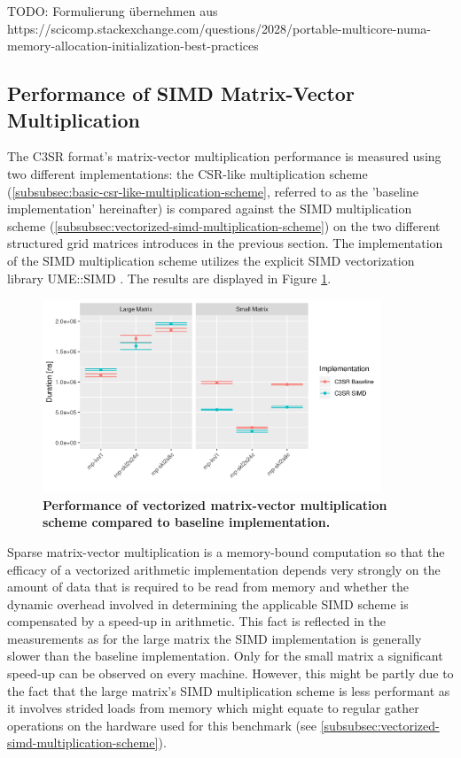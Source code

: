 \documentclass{article}
\begin{document}
    TODO: Formulierung übernehmen aus https://scicomp.stackexchange.com/questions/2028/portable-multicore-numa-memory-allocation-initialization-best-practices

  \subsection{Performance of SIMD Matrix-Vector Multiplication}

    The C3SR format's matrix-vector multiplication performance is measured using two different implementations: the CSR-like multiplication scheme (\ref{subsubsec:basic-csr-like-multiplication-scheme}, referred to as the 'baseline implementation' hereinafter) is compared against the SIMD multiplication scheme (\ref{subsubsec:vectorized-simd-multiplication-scheme}) on the two different structured grid matrices introduces in the previous section. The implementation of the SIMD multiplication scheme utilizes the explicit SIMD vectorization library UME::SIMD \cite{umesimd2017}. The results are displayed in Figure \ref{fig:arithmetic-performance}.

    \begin{figure}[!ht]
      \centering
      \includegraphics[width=0.9\textwidth]{assets/arithmetic_performance}
      \caption[Performance of vectorized matrix-vector multiplication scheme compared to baseline implementation.]{\textbf{Performance of vectorized matrix-vector multiplication scheme compared to baseline implementation.}}
      \label{fig:arithmetic-performance}
    \end{figure}

    Sparse matrix-vector multiplication is a memory-bound computation so that the efficacy of a vectorized arithmetic implementation depends very strongly on the amount of data that is required to be read from memory and whether the dynamic overhead involved in determining the applicable SIMD scheme is compensated by a speed-up in arithmetic. This fact is reflected in the measurements as for the large matrix the SIMD implementation is generally slower than the baseline implementation. Only for the small matrix a significant speed-up can be observed on every machine. However, this might be partly due to the fact that the large matrix's SIMD multiplication scheme is less performant as it involves strided loads from memory which might equate to regular gather operations on the hardware used for this benchmark (see \ref{subsubsec:vectorized-simd-multiplication-scheme}).
\end{document}
